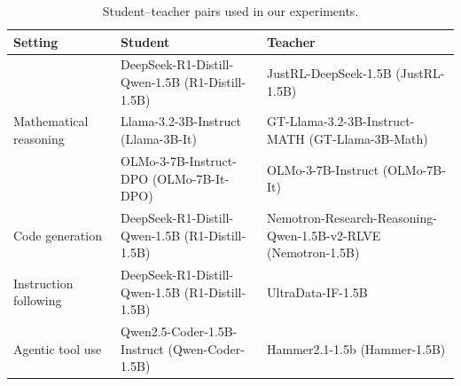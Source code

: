\begin{table}[t]
\centering
\small
\caption{
Student--teacher pairs used in our experiments.
}
\label{tab:full}
\setlength{\tabcolsep}{5pt}
\renewcommand{\arraystretch}{1.12}
\begin{tabularx}{\textwidth}{@{}lXX@{}}
\toprule
\textbf{Setting} & \textbf{Student} & \textbf{Teacher} \\
\midrule

\multirow{3}{*}{Mathematical reasoning}
& DeepSeek-R1-Distill-Qwen-1.5B\newline
{\footnotesize (R1-Distill-1.5B)}
& JustRL-DeepSeek-1.5B\newline
{\footnotesize (JustRL-1.5B)} \\

& Llama-3.2-3B-Instruct\newline
{\footnotesize (Llama-3B-It)}
& GT-Llama-3.2-3B-Instruct-MATH\newline
{\footnotesize (GT-Llama-3B-Math)} \\

& OLMo-3-7B-Instruct-DPO\newline
{\footnotesize (OLMo-7B-It-DPO)}
& OLMo-3-7B-Instruct\newline
{\footnotesize (OLMo-7B-It)} \\

\midrule

Code generation
& DeepSeek-R1-Distill-Qwen-1.5B\newline
{\footnotesize (R1-Distill-1.5B)}
& Nemotron-Research-Reasoning-Qwen-1.5B-v2-RLVE\newline
{\footnotesize (Nemotron-1.5B)} \\

Instruction following
& DeepSeek-R1-Distill-Qwen-1.5B\newline
{\footnotesize (R1-Distill-1.5B)}
& UltraData-IF-1.5B \\

Agentic tool use
& Qwen2.5-Coder-1.5B-Instruct\newline
{\footnotesize (Qwen-Coder-1.5B)}
& Hammer2.1-1.5b\newline
{\footnotesize (Hammer-1.5B)} \\

\bottomrule
\end{tabularx}
\end{table}

